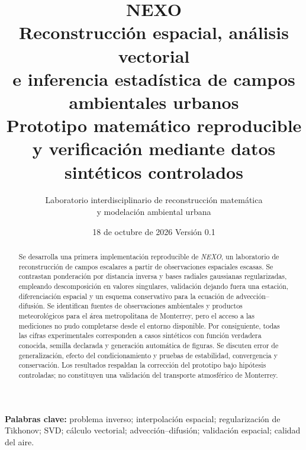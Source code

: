 \documentclass[11pt,a4paper]{article}
\title{\Huge\textbf{NEXO}\\[.4em]\Large Reconstrucción espacial, análisis vectorial\\ e inferencia estadística de campos ambientales urbanos\\[.8em]\normalsize Prototipo matemático reproducible y verificación mediante datos sintéticos controlados}
\author{Laboratorio interdisciplinario de reconstrucción matemática\\ y modelación ambiental urbana}
\date{18 de octubre de 2026 \quad Versión 0.1}
\begin{document}
\maketitle\vspace{1cm}
\begin{center}\end{center}
\vspace{1cm}
\begin{abstract}
Se desarrolla una primera implementación reproducible de \emph{NEXO}, un laboratorio de reconstrucción de campos escalares a partir de observaciones espaciales escasas. Se contrastan ponderación por distancia inversa y bases radiales gaussianas regularizadas, empleando descomposición en valores singulares, validación dejando fuera una estación, diferenciación espacial y un esquema conservativo para la ecuación de advección--difusión. Se identifican fuentes de observaciones ambientales y productos meteorológicos para el área metropolitana de Monterrey, pero el acceso a las mediciones no pudo completarse desde el entorno disponible. Por consiguiente, todas las cifras experimentales corresponden a casos sintéticos con función verdadera conocida, semilla declarada y generación automática de figuras. Se discuten error de generalización, efecto del condicionamiento y pruebas de estabilidad, convergencia y conservación. Los resultados respaldan la corrección del prototipo bajo hipótesis controladas; no constituyen una validación del transporte atmosférico de Monterrey.
\end{abstract}
\noindent\textbf{Palabras clave:} problema inverso; interpolación espacial; regularización de Tikhonov; SVD; cálculo vectorial; advección--difusión; validación espacial; calidad del aire.\\[1em]
\tableofcontents\clearpage







\appendix

\end{document}
